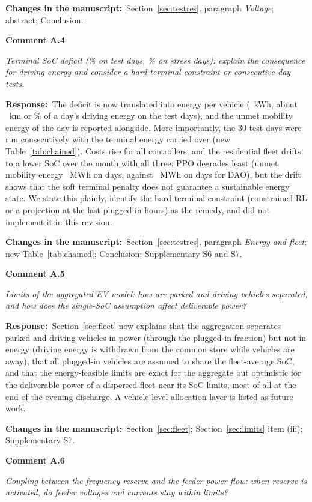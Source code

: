 \documentclass[10pt,a4paper]{article}
\newcommand{\rc}[1]{\par\noindent\textbf{Comment #1}\par}
\newcommand{\resp}{\par\noindent\textbf{Response:}\ }
\newcommand{\chg}{\par\noindent\textbf{Changes in the manuscript:}\ }
\begin{document}
\chg Section~\ref{sec:testres}, paragraph \emph{Voltage}; abstract;
Conclusion.

\rc{A.4} \emph{Terminal SoC deficit (\TPPOSocDefPct\% on test days,
\SPPOSocDefPct\% on stress days): explain the consequence for driving
energy and consider a hard terminal constraint or consecutive-day
tests.}

\resp The deficit is now translated into energy per vehicle
(\TPPOSocDefKwhVeh~kWh, about \TPPOSocDefKm~km or \TPPOSocDefDrivePct\%
of a day's driving energy on the test days), and the unmet mobility
energy of the day is reported alongside. More importantly, the 30 test
days were run consecutively with the terminal energy carried over
(new Table~\ref{tab:chained}). Costs rise for all controllers, and the
residential fleet drifts to a lower SoC over the month with all three;
PPO degrades least (unmet mobility energy \ChPPOUnmetMwhTotal~MWh on
\ChPPOUnmetDays{} days, against \ChDAOUnmetMwhTotal~MWh on
\ChDAOUnmetDays{} days for DAO), but the drift shows that the soft
terminal penalty does not guarantee a sustainable energy state. We
state this plainly, identify the hard terminal constraint (constrained
RL or a projection at the last plugged-in hours) as the remedy, and
did not implement it in this revision.

\chg Section~\ref{sec:testres}, paragraph \emph{Energy and fleet};
new Table~\ref{tab:chained}; Conclusion; Supplementary S6 and S7.

\rc{A.5} \emph{Limits of the aggregated EV model: how are parked and
driving vehicles separated, and how does the single-SoC assumption
affect deliverable power?}

\resp Section~\ref{sec:fleet} now explains that the aggregation
separates parked and driving vehicles in power (through the plugged-in
fraction) but not in energy (driving energy is withdrawn from the
common store while vehicles are away), that all plugged-in vehicles
are assumed to share the fleet-average SoC, and that the
energy-feasible limits are exact for the aggregate but optimistic
for the deliverable power of a dispersed fleet near its SoC limits,
most of all at the end of the evening discharge. A vehicle-level
allocation layer is listed as future work.

\chg Section~\ref{sec:fleet}; Section~\ref{sec:limits} item (iii);
Supplementary S7.

\rc{A.6} \emph{Coupling between the frequency reserve and the feeder
power flow: when reserve is activated, do feeder voltages and currents
stay within limits?}
\end{document}
